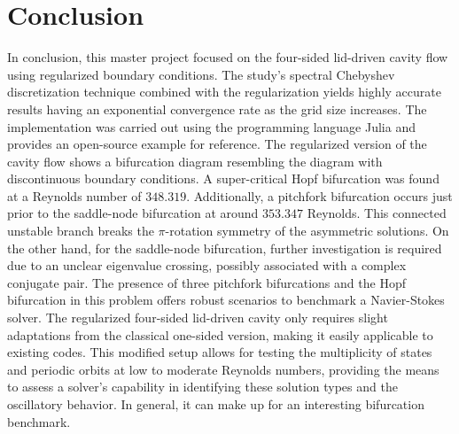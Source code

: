 
\section{Conclusion} \label{concl}

In conclusion, this master project focused on the four-sided lid-driven cavity flow using
regularized boundary conditions. The study's spectral Chebyshev discretization
technique combined with the regularization yields highly accurate results
having an exponential convergence rate as the grid size increases. The
implementation was carried out using the programming language Julia and
provides an open-source example for reference. The regularized version of the
cavity flow shows a bifurcation diagram resembling the diagram with
discontinuous boundary conditions. A super-critical Hopf bifurcation was found
at a Reynolds number of $348.319$. Additionally, a pitchfork bifurcation occurs
just prior to the saddle-node bifurcation at around $353.347$ Reynolds. This
connected unstable branch breaks the $\pi$-rotation symmetry of the asymmetric
solutions. On the other hand, for the saddle-node bifurcation, further
investigation is required due to an unclear eigenvalue crossing, possibly
associated with a complex conjugate pair. The presence of three pitchfork
bifurcations and the Hopf bifurcation in this problem offers robust scenarios
to benchmark a Navier-Stokes solver. The regularized four-sided lid-driven
cavity only requires slight adaptations from the classical one-sided version,
making it easily applicable to existing codes. This modified setup allows for
testing the multiplicity of states and periodic orbits at low to moderate
Reynolds numbers, providing the means to assess a solver's capability in
identifying these solution types and the oscillatory behavior. In general, it
can make up for an interesting bifurcation benchmark.
